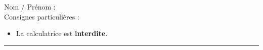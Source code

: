 
\newcommand{\C}{\mathcal{C}}



\pagestyle{fancy}
\fancyhead[R]{\today}

\reversemarginpar

\null\vspace{-30pt}
Nom / Prénom : \\

Consignes particulières : 
\begin{itemize}[label=$\bullet$]
	\item 
	La calculatrice est \textbf{interdite}.
\end{itemize}

\hrule

